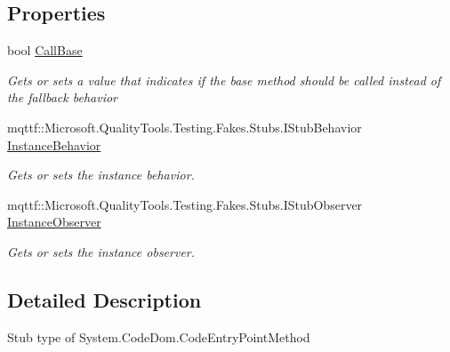 \subsection*{Properties}
\begin{DoxyCompactItemize}
\item 
bool \hyperlink{class_system_1_1_code_dom_1_1_fakes_1_1_stub_code_entry_point_method_ac96c7e64dbe018973d43df8525162228}{Call\-Base}
\begin{DoxyCompactList}\small\item\em Gets or sets a value that indicates if the base method should be called instead of the fallback behavior\end{DoxyCompactList}\item 
mqttf\-::\-Microsoft.\-Quality\-Tools.\-Testing.\-Fakes.\-Stubs.\-I\-Stub\-Behavior \hyperlink{class_system_1_1_code_dom_1_1_fakes_1_1_stub_code_entry_point_method_a722fcdb9e8a633e12b6da2f46e4a9cc7}{Instance\-Behavior}
\begin{DoxyCompactList}\small\item\em Gets or sets the instance behavior.\end{DoxyCompactList}\item 
mqttf\-::\-Microsoft.\-Quality\-Tools.\-Testing.\-Fakes.\-Stubs.\-I\-Stub\-Observer \hyperlink{class_system_1_1_code_dom_1_1_fakes_1_1_stub_code_entry_point_method_ab84925a607070db134c9390d0565b5cb}{Instance\-Observer}
\begin{DoxyCompactList}\small\item\em Gets or sets the instance observer.\end{DoxyCompactList}\end{DoxyCompactItemize}


\subsection{Detailed Description}
Stub type of System.\-Code\-Dom.\-Code\-Entry\-Point\-Method



